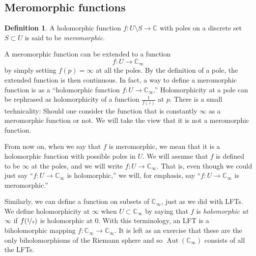 \documentclass[12pt,openany]{book}
\newcommand{\Aut}{\operatorname{Aut}}
\newcommand{\C}{{\mathbb{C}}}
\newcommand{\myindex}[1]{#1\index{#1}}
\newcommand{\myquote}[1]{``#1''}
\theoremstyle{plain}
\theoremstyle{remark}
\theoremstyle{definition}
\newtheorem{defn}[thm]{Definition}
\theoremstyle{exercise}
\theoremstyle{example}
\begin{document}

\subsection{Meromorphic functions}
\label{subsec:meromorphic}

\begin{defn}
A holomorphic function $f \colon U \setminus S \to \C$ with poles on a
discrete set $S \subset U$ is said to be \emph{\myindex{meromorphic}}.
\end{defn}

A meromorphic function can be extended to a function
\begin{equation*}
f \colon U \to \C_{\infty}
\end{equation*}
by simply setting $f(p) = \infty$ at all the poles.
By the definition of a pole, the extended function is then continuous.
In fact, a way to define
a meromorphic function is as a
\myquote{holomorphic function $f \colon U \to \C_{\infty}$.}
Holomorphicity at a pole can be
rephrased as holomorphicity of a function $\frac{1}{f(z)}$ at $p$.
There is a small technicality: Should one consider the function
that is constantly $\infty$ as a meromorphic function or not.
We will take the view that it is not a meromorphic function.

From now on, when we say that $f$ is
meromorphic, we mean that it is a holomorphic function with possible
poles in $U$.  We will assume that $f$ is defined to be $\infty$
at the poles, and
we will write $f \colon U \to \C_\infty$.  That is, even though we
could just say \myquote{$f \colon U \to \C_\infty$ is holomorphic,} we will, for emphasis,
say \myquote{$f \colon U \to \C_\infty$ is meromorphic.}

Similarly, we can define a function on subsets of $\C_\infty$, just as
we did with LFTs.
We define holomorphicity at $\infty$ when $U \subset
\C_\infty$ by saying that $f$ is \emph{\myindex{holomorphic at $\infty$}}
if $f(\nicefrac{1}{z})$ is holomorphic at $0$.
With this terminology, an LFT is a biholomorphic mapping $f \colon
\C_\infty \to \C_\infty$.  It is left as an exercise that
these are the only biholomorphisms of the Riemann sphere and so
$\Aut(\C_\infty)$ consists of all the LFTs.
\end{document}
